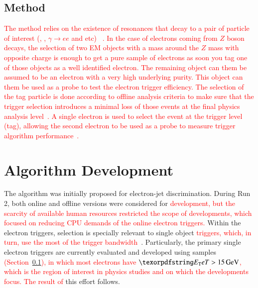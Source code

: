 


\subsection{\TnP Method}\label{ssec:tnp}

\textcolor{red}{The \tnp{} method relies on the existence of resonances that decay to a pair of particle of interest (\Zee{}, \Jee{}, $\gamma \rightarrow ee$ and etc) ~\cite{PERF-2016-01}. In the case of electrons coming from $Z$ boson decays, the selection of two EM objects with a mass around the $Z$ mass with opposite charge is enough to get a pure sample of electrons as soon you tag one of those objects as a well identified electron. The remaining object can them be assumed to be an electron with a very high underlying purity. This object can them be used as a probe to test the electron trigger efficiency. The selection of the tag particle is done according to offline analysis criteria to make sure that the trigger selection introduces a minimal loss of those events at the final physics analysis level~\cite{aaboud2019electron}. A single electron is used to select the event at the trigger level (tag), allowing the second electron to be used as a probe to measure trigger algorithm performance~\cite{aad2020performance}.}


\section{Algorithm Development}\label{ssec:rnn_for_online_and_eletrons}

The \rnn{} algorithm was initially proposed for electron-jet discrimination. 
During Run 2, both online and offline versions
were considered for \textcolor{red}{ development, but the scarcity of available human resources restricted the scope of developments, which focused on reducing CPU demands of the online electron triggers.} Within the electron triggers, \hlt{} selection is
specially relevant to single object \textcolor{red}{triggers, which, in turn, use the most of the trigger bandwidth}~\cite{aad2020performance}. Particularly, the primary single electron triggers
are currently evaluated and developed using \Zee{} \tnp{} samples 
\textcolor{red}{(Section~\ref{ssec:tnp}), in which most electrons have $\et>\SI{15}{\GeV}$, which is the region of interest in physics studies and on which the \rnn{} developments focus. The result of} this effort
follows.


